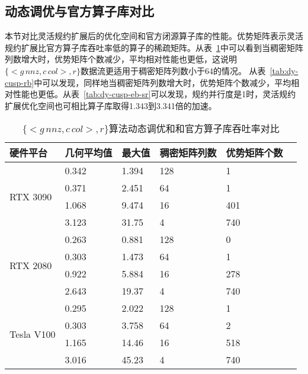 \subsection{动态调优与官方算子库对比}\label{sec:overcu}
本节对比灵活规约扩展后的优化空间和官方闭源算子库的性能。优势矩阵表示灵活规约扩展比官方算子库吞吐率低的算子的稀疏矩阵。从表~\ref{tab:dy-cusp-eb}中可以看到当稠密矩阵列数增大时，优势矩阵个数减少，平均相对性能也更低，这说明$\{<g\,nnz , c\,col>,r\}$数据流更适用于稠密矩阵列数小于64的情况。
从表~\ref{tab:dy-cusp-rb}中可以发现，同样地当稠密矩阵列数增大时，优势矩阵个数减少，平均相对性能也更低。从表~\ref{tab:dy-cusp-eb-sr}可以发现，规约并行度是1时，灵活规约扩展优化空间也可相比算子库取得1.343到3.341倍的加速。
\begin{table}
  \centering
  \caption{$\{<g\,nnz , c\,col>,r\}$算法动态调优和和官方算子库吞吐率对比}
  \begin{tabular}{llllll}
  \toprule
  硬件平台 & 几何平均值 & 最大值  & 稠密矩阵列数 & 优势矩阵个数 \\
  \midrule
  \multirow{4}{*}{RTX 3090}& 0.342 & 1.394  & 128 & 1\\
                           & 0.371 & 2.451  & 64 & 1\\
                           & 1.068 & 9.474  & 16 & 401\\
                           & 3.123 & 31.75  & 4 & 740\\
  \hline
  \multirow{4}{*}{RTX 2080}& 0.263 & 0.881  & 128 & 0\\
                          & 0.303 & 1.473   & 64 & 1\\
                          & 0.922 & 5.884  & 16 & 278\\
                          & 2.643 & 19.37  & 4 & 740\\
  \hline
  \multirow{4}{*}{Tesla V100}& 0.295 & 2.022  & 128 & 1\\
                          & 0.303 & 3.758  & 64 & 2\\
                          & 1.165 & 14.46  & 16 & 518\\
                          & 3.016 & 45.23  & 4 & 740\\
  \bottomrule
  \end{tabular}
  \label{tab:dy-cusp-eb}
\end{table}
